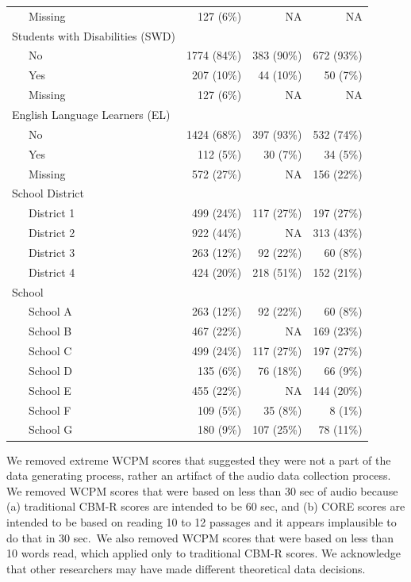 \documentclass[
  english,
  man, fleqn, noextraspace]{apa6}
\begin{document}
\begin{center}
\begin{ThreePartTable}
\begin{longtable}{lrrr}
\ \ \ Missing & 127 (6\%) & NA & NA\\
Students with Disabilities (SWD) &  &  & \\
\ \ \ No & 1774 (84\%) & 383 (90\%) & 672 (93\%)\\
\ \ \ Yes & 207 (10\%) & 44 (10\%) & 50 (7\%)\\
\ \ \ Missing & 127 (6\%) & NA & NA\\
English Language Learners (EL) &  &  & \\
\ \ \ No & 1424 (68\%) & 397 (93\%) & 532 (74\%)\\
\ \ \ Yes & 112 (5\%) & 30 (7\%) & 34 (5\%)\\
\ \ \ Missing & 572 (27\%) & NA & 156 (22\%)\\
School District &  &  & \\
\ \ \ District 1 & 499 (24\%) & 117 (27\%) & 197 (27\%)\\
\ \ \ District 2 & 922 (44\%) & NA & 313 (43\%)\\
\ \ \ District 3 & 263 (12\%) & 92 (22\%) & 60 (8\%)\\
\ \ \ District 4 & 424 (20\%) & 218 (51\%) & 152 (21\%)\\
School &  &  & \\
\ \ \ School A & 263 (12\%) & 92 (22\%) & 60 (8\%)\\
\ \ \ School B & 467 (22\%) & NA & 169 (23\%)\\
\ \ \ School C & 499 (24\%) & 117 (27\%) & 197 (27\%)\\
\ \ \ School D & 135 (6\%) & 76 (18\%) & 66 (9\%)\\
\ \ \ School E & 455 (22\%) & NA & 144 (20\%)\\
\ \ \ School F & 109 (5\%) & 35 (8\%) & 8 (1\%)\\
\ \ \ School G & 180 (9\%) & 107 (25\%) & 78 (11\%)\\
\bottomrule
\end{longtable}

\end{ThreePartTable}
\end{center}

We removed extreme WCPM scores that suggested they were not a part of the data generating process, rather an artifact of the audio data collection process. We removed WCPM scores that were based on less than 30 sec of audio because (a) traditional CBM-R scores are intended to be 60 sec, and (b) CORE scores are intended to be based on reading 10 to 12 passages and it appears implausible to do that in 30 sec.~We also removed WCPM scores that were based on less than 10 words read, which applied only to traditional CBM-R scores. We acknowledge that other researchers may have made different theoretical data decisions.
\end{document}
